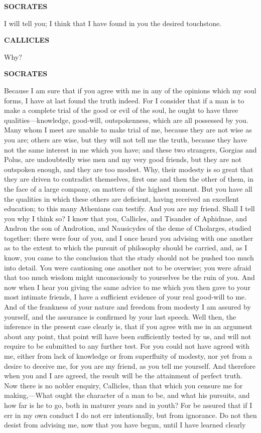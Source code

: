 \documentclass[11pt,letter]{article}
\begin{document}
\par \textbf{SOCRATES}
\par   I will tell you; I think that I have found in you the desired touchstone.

\par \textbf{CALLICLES}
\par   Why?

\par \textbf{SOCRATES}
\par   Because I am sure that if you agree with me in any of the opinions which my soul forms, I have at last found the truth indeed. For I consider that if a man is to make a complete trial of the good or evil of the soul, he ought to have three qualities—knowledge, good-will, outspokenness, which are all possessed by you. Many whom I meet are unable to make trial of me, because they are not wise as you are; others are wise, but they will not tell me the truth, because they have not the same interest in me which you have; and these two strangers, Gorgias and Polus, are undoubtedly wise men and my very good friends, but they are not outspoken enough, and they are too modest. Why, their modesty is so great that they are driven to contradict themselves, first one and then the other of them, in the face of a large company, on matters of the highest moment. But you have all the qualities in which these others are deficient, having received an excellent education; to this many Athenians can testify. And you are my friend. Shall I tell you why I think so? I know that you, Callicles, and Tisander of Aphidnae, and Andron the son of Androtion, and Nausicydes of the deme of Cholarges, studied together:  there were four of you, and I once heard you advising with one another as to the extent to which the pursuit of philosophy should be carried, and, as I know, you came to the conclusion that the study should not be pushed too much into detail. You were cautioning one another not to be overwise; you were afraid that too much wisdom might unconsciously to yourselves be the ruin of you. And now when I hear you giving the same advice to me which you then gave to your most intimate friends, I have a sufficient evidence of your real good-will to me. And of the frankness of your nature and freedom from modesty I am assured by yourself, and the assurance is confirmed by your last speech. Well then, the inference in the present case clearly is, that if you agree with me in an argument about any point, that point will have been sufficiently tested by us, and will not require to be submitted to any further test. For you could not have agreed with me, either from lack of knowledge or from superfluity of modesty, nor yet from a desire to deceive me, for you are my friend, as you tell me yourself. And therefore when you and I are agreed, the result will be the attainment of perfect truth. Now there is no nobler enquiry, Callicles, than that which you censure me for making,—What ought the character of a man to be, and what his pursuits, and how far is he to go, both in maturer years and in youth? For be assured that if I err in my own conduct I do not err intentionally, but from ignorance. Do not then desist from advising me, now that you have begun, until I have learned clearly 
\end{document}
